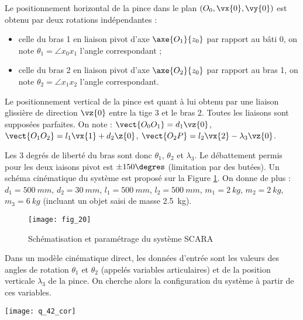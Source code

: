  Le positionnement horizontal de la pince dans le plan $\left(O_0,\vx{0},\vy{0}\right)$ est obtenu par deux rotations indépendantes : 
 \begin{itemize}
 \item celle du bras 1 en liaison pivot d'axe $\axe{O_1}{z_0}$ par rapport au bâti 0, on note $\theta_1 = \angle{x_0}{x_1}$ l'angle correspondant ;
 \item celle du bras 2 en liaison pivot d'axe $\axe{O_2}{z_0}$ par rapport au bras 1, on note $\theta_2 = \angle{x_1}{x_2}$ l'angle correspondant.
 \end{itemize}
 
Le positionnement vertical de la pince est quant à lui obtenu par une liaison glissière de direction
 $\vz{0}$ entre la tige 3 et le bras 2. 
Toutes les liaisons sont supposées parfaites.
On note : $\vect{O_0O_1} = d_1 \vz{0}$, 
$\vect{O_1O_2} = l_1 \vx{1}+d_2 \z{0}$, 
$\vect{O_2 P} =l_2\vx{2} - \lambda_3 \vz{0}$.

Les 3 degrés de liberté du bras sont donc $\theta_1$, $\theta_2$ et $\lambda_3$. Le débattement permis pour les deux iaisons pivot est $\pm 150\degres$ (limitation par des butées). 
Un schéma cinématique du système est proposé sur la Figure \ref{xens_2027_fig20}.
 On donne de plus :
 $d_1 =\SI{500}{mm}$, $d_2 =\SI{30}{mm}$, $l_1=\SI{500}{mm}$, $l_2 =\SI{500}{mm}$, 
$m_1 =\SI{2}{kg}$, $m_2=\SI{2}{kg}$, $m_3 =\SI{6}{kg}$ (incluant un objet saisi de masse \SI{2,5}{kg}).

\begin{figure}[!h]
\centering
\texttt{[image: fig\_20]}
\caption{Schématisation et paramétrage du système SCARA \label{xens_2027_fig20}}
\end{figure}




 Dans un modèle cinématique direct, les données d'entrée sont les valeurs des angles de rotation
$\theta_1$ et $\theta_2$ (appelés variables articulaires) et de la position verticale $\lambda_3$ de la pince. On cherche alors la configuration du système à partir de ces variables. 

  \ifprof
 \begin{corrige}
 \begin{center}
\texttt{[image: q\_42\_cor]}
\end{center}
 \end{corrige}
 \else
 \fi
 
